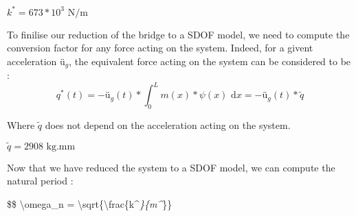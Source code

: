 $k^{*} = 673* 10^3\text{ N/m}$

To finilise our reduction of the bridge to a SDOF model, we need to
compute the conversion factor for any force acting on the system.
Indeed, for a givent acceleration \(ü_g\), the equivalent force acting
on the system can be considered to be :
\[ q^*(t) = - ü_g(t) * \int_{0}^{L} m(x) * \psi(x) \text{ d}x = - ü_g(t) * \tilde{q}\]

Where \(\tilde{q}\) does not depend on the acceleration acting on the
system.

\begin{Shaded}
\begin{Highlighting}[]
\OperatorTok{=}\OperatorTok{*}\OperatorTok{=}
\CharTok{\textbackslash{}\textbackslash{}}\CharTok{\{\{}\SpecialCharTok{\{}\SpecialStringTok{ }\CharTok{\textbackslash{}\textbackslash{}}\CharTok{\{\{}\NormalTok{))}
\end{Highlighting}
\end{Shaded}

$ \tilde{q} = 2908 \text{ kg.mm}$

Now that we have reduced the system to a SDOF model, we can compute the
natural period :

\$\$ \textbackslash omega\_n =
\textbackslash sqrt\{\textbackslash frac\{k\^{}\emph{\}\{m\^{}}\}\}

